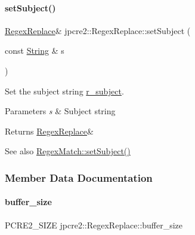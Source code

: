 \paragraph{\texorpdfstring{set\+Subject()}{setSubject()}}
{\footnotesize\ttfamily \hyperlink{classjpcre2_1_1RegexReplace}{Regex\+Replace}\& jpcre2\+::\+Regex\+Replace\+::set\+Subject (\begin{DoxyParamCaption}\item[{const \hyperlink{namespacejpcre2_a91f03070152fb228bc116c5a737f1d16}{String} \&}]{s }\end{DoxyParamCaption})\hspace{0.3cm}{\ttfamily [inline]}}



Set the subject string \hyperlink{classjpcre2_1_1RegexReplace_a2290e5d9f1c2336abd431fef97e72c93}{r\+\_\+subject}. 


\begin{DoxyParams}{Parameters}
{\em s} & Subject string \\
\hline
\end{DoxyParams}
\begin{DoxyReturn}{Returns}
\hyperlink{classjpcre2_1_1RegexReplace}{Regex\+Replace}\& 
\end{DoxyReturn}
\begin{DoxySeeAlso}{See also}
\hyperlink{classjpcre2_1_1RegexMatch_a635c652195deaa8ebb9e107c4f972aab_a635c652195deaa8ebb9e107c4f972aab}{Regex\+Match\+::set\+Subject()} 
\end{DoxySeeAlso}


\subsubsection{Member Data Documentation}
\hypertarget{classjpcre2_1_1RegexReplace_a44abce541819ceb51e342411b48e95cb_a44abce541819ceb51e342411b48e95cb}{}\label{classjpcre2_1_1RegexReplace_a44abce541819ceb51e342411b48e95cb_a44abce541819ceb51e342411b48e95cb} 
\paragraph{\texorpdfstring{buffer\+\_\+size}{buffer\_size}}
{\footnotesize\ttfamily P\+C\+R\+E2\+\_\+\+S\+I\+ZE jpcre2\+::\+Regex\+Replace\+::buffer\+\_\+size\hspace{0.3cm}{\ttfamily [private]}}



